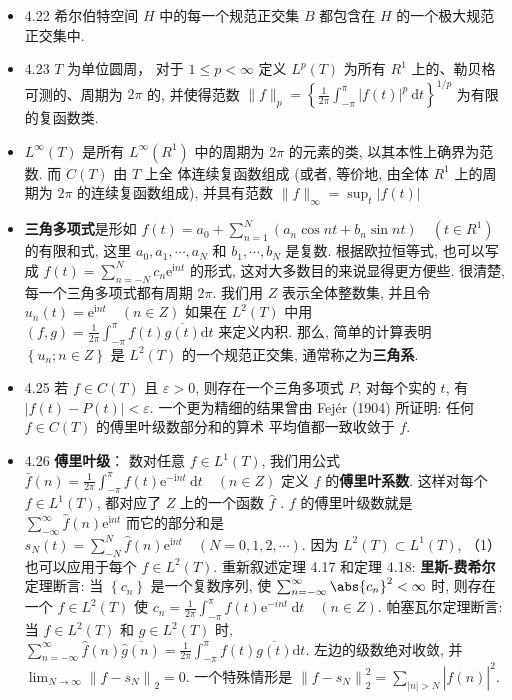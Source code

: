 \begin{itemize}
\item 4.22 希尔伯特空间 $H$ 中的每一个规范正交集 $B$ 都包含在 $H$ 的一个极大规范正交集中.

\item 4.23 $T$ 为单位圆周， 对于 $1 \leqslant p<\infty$ 定义 $L^{p}(T)$ 为所有 $R^{1}$ 上的、勒贝格可测的、周期为 $2 \pi$ 的, 并使得范数 $\|f\|_{p}=\left\{\frac{1}{2 \pi} \int_{-\pi}^{\pi}|f(t)|^{p} \mathrm{~d} t\right\}^{1 / p}$ 为有限的复函数类.

\item $L^{\infty}(T)$ 是所有 $L^{\infty}\left(R^{1}\right)$ 中的周期为 $2 \pi$ 的元素的类, 以其本性上确界为范数. 而 $C(T)$ 由 $T$ 上全 体连续复函数组成 (或者, 等价地, 由全体 $R^{1}$ 上的周期为 $2 \pi$ 的连续复函数组成), 并具有范数 $\|f\|_{\infty}=\sup _{t}|f(t)|$

\item \textbf{三角多项式}是形如 $f(t)=a_{0}+\sum_{n=1}^{N}\left(a_{n} \cos n t+b_{n} \sin n t\right) \quad\left(t \in R^{1}\right)$ 的有限和式, 这里 $a_{0}, a_{1}, \cdots, a_{N}$ 和 $b_{1}, \cdots, b_{N}$ 是复数. 根据欧拉恒等式, 也可以写成 $f(t)=\sum_{n=-N}^{N} c_{n} \mathrm{e}^{\mathrm{i} n t}$ 的形式, 这对大多数目的来说显得更方便些. 很清楚, 每一个三角多项式都有周期 $2 \pi$. 我们用 $Z$ 表示全体整数集, 并且令 $u_{n}(t)=\mathrm{e}^{\mathrm{i} n t} \quad(n \in Z)$ 如果在 $L^{2}(T)$ 中用 $(f, g)=\frac{1}{2 \pi} \int_{-\pi}^{\pi} f(t) \overline{g(t)} \mathrm{d} t$ 来定义内积. 那么, 简单的计算表明 $\left\{u_{n} ; n \in Z\right\}$ 是 $L^{2}(T)$ 的一个规范正交集, 通常称之为\textbf{三角系}.

\item 4.25 若 $f \in C(T)$ 且 $\varepsilon>0$, 则存在一个三角多项式 $P$, 对每个实的 $t$, 有 $|f(t)-P(t)|<\varepsilon$. 一个更为精细的结果曾由 Fejér (1904) 所证明: 任何 $f \in C(T)$ 的傅里叶级数部分和的算术 平均值都一致收敛于 $f$.

\item 4.26 \textbf{傅里叶级}： 数对任意 $f \in L^{1}(T)$, 我们用公式 $\bar{f}(n)=\frac{1}{2 \pi} \int_{-\pi}^{\pi} f(t) \mathrm{e}^{-\mathrm{i} n t} \mathrm{~d} t \quad(n \in Z)$ 定义 $f$ 的\textbf{傅里叶系数}. 这样对每个 $f \in L^{1}(T)$, 都对应了 $Z$ 上的一个函数 $\hat{f}$ . $f$ 的傅里叶级数就是 $\sum_{-\infty}^{\infty} \hat{f}(n) \mathrm{e}^{\mathrm{i} n t}$ 而它的部分和是 $s_{N}(t)=\sum_{-N}^{N} \hat{f}(n) \mathrm{e}^{\mathrm{i} n t} \quad(N=0,1,2, \cdots)$. 因为 $L^{2}(T) \subset L^{1}(T)$, （1）也可以应用于每个 $f \in L^{2}(T)$. 重新叙述定理 4.17 和定理 4.18:
\textbf{里斯-费希尔}定理断言: 当 $\left\{c_{n}\right\}$ 是一个复数序列, 使 $\sum_{n=-\infty}^{\infty} \abs{c_n}^2 < \infty$ 时, 则存在一个 $f \in L^{2}(T)$ 使 $c_{n}=\frac{1}{2 \pi} \int_{-\pi}^{\pi} f(t) \mathrm{e}^{-i n t} \mathrm{~d} t \quad(n \in Z)$. 帕塞瓦尔定理断言: 当 $f \in L^{2}(T)$ 和 $g \in L^{2}(T)$ 时, $\sum_{n=-\infty}^{\infty} \hat{f}(n) \overline{\hat{g}(n)}=\frac{1}{2 \pi} \int_{-\pi}^{\pi} f(t) \overline{g(t)} \mathrm{d} t$. 
左边的级数绝对收敛, 并 $\lim _{N \rightarrow \infty}\left\|f-s_{N}\right\|_{2}=0$. 一个特殊情形是 $\left\|f-s_{N}\right\|_{2}^{2}=\sum_{|n|>N}|\hat{f}(n)|^{2}$.
\end{itemize}


